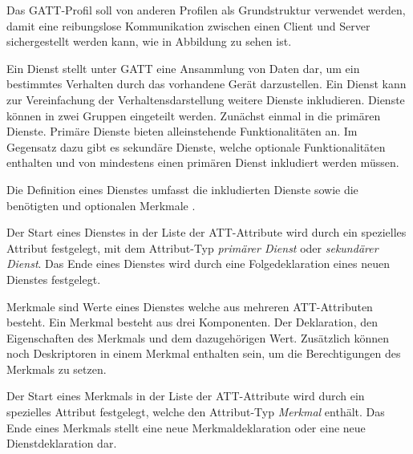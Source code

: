 
Das \ac{GATT}-Profil soll von anderen Profilen als Grundstruktur verwendet werden, damit eine reibungslose Kommunikation zwischen einen Client und Server sichergestellt werden kann, wie in Abbildung  zu sehen ist. \cite[S.~1470]{bluetoothCore}


Ein Dienst stellt unter \ac{GATT} eine Ansammlung von Daten dar, um ein bestimmtes Verhalten durch das vorhandene Gerät darzustellen. Ein Dienst kann zur Vereinfachung der Verhaltensdarstellung weitere Dienste inkludieren. Dienste können in zwei Gruppen eingeteilt werden. Zunächst einmal in die primären Dienste. Primäre Dienste bieten alleinstehende Funktionalitäten an. Im Gegensatz dazu gibt es sekundäre Dienste, welche optionale Funktionalitäten enthalten und von mindestens einen primären Dienst inkludiert werden müssen. \cite[S.~281]{bluetoothCore}

Die Definition eines Dienstes umfasst die inkludierten Dienste sowie die benötigten und optionalen Merkmale \cite[S.~1481]{bluetoothCore}.

Der Start eines Dienstes in der Liste der \ac{ATT}-Attribute wird durch ein spezielles Attribut festgelegt, mit dem Attribut-Typ \textit{primärer Dienst} oder \textit{sekundärer Dienst}. Das Ende eines Dienstes wird durch eine Folgedeklaration eines neuen Dienstes festgelegt. \cite[S.~1483]{bluetoothCore}

Merkmale sind Werte eines Dienstes welche aus mehreren \ac{ATT}-Attributen besteht. Ein Merkmal besteht aus drei Komponenten. Der Deklaration, den Eigenschaften des Merkmals und dem dazugehörigen Wert. Zusätzlich können noch Deskriptoren in einem Merkmal enthalten sein, um die Berechtigungen des Merkmals zu setzen. \cite[S.~281]{bluetoothCore}

Der Start eines Merkmals in der Liste der \ac{ATT}-Attribute wird durch ein spezielles Attribut festgelegt, welche den Attribut-Typ \textit{Merkmal} enthält. Das Ende eines Merkmals stellt eine neue Merkmaldeklaration oder eine neue Dienstdeklaration dar. \cite[S.~1484ff.]{bluetoothCore}

